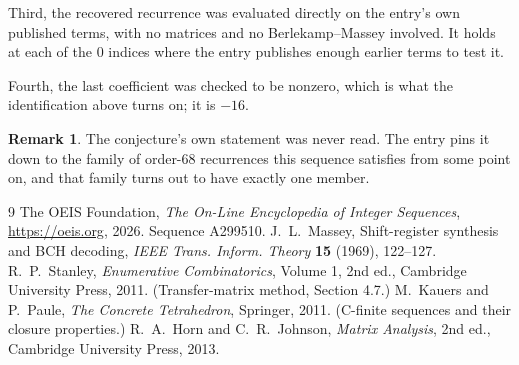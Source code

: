 \documentclass[11pt,a4paper]{article}
\theoremstyle{plain}
\theoremstyle{definition}
\newtheorem{remark}[theorem]{Remark}
\begin{document}
Third, the recovered recurrence was evaluated directly on the entry's own published terms, with
no matrices and no Berlekamp--Massey involved. It holds at each of the $0$ indices where
the entry publishes enough earlier terms to test it.

Fourth, the last coefficient was checked to be nonzero, which is what the identification above
turns on; it is $-16$.

\begin{remark}
The conjecture's own statement was never read. The entry pins it down to the family of
order-$68$ recurrences this sequence satisfies from some point on, and that family turns
out to have exactly one member.
\end{remark}

\begin{thebibliography}{9}
 The OEIS Foundation, \emph{The On-Line Encyclopedia of Integer
Sequences}, \url{https://oeis.org}, 2026. Sequence A299510.
 J.~L.~Massey, Shift-register synthesis and BCH decoding, \emph{IEEE
Trans. Inform. Theory} \textbf{15} (1969), 122--127.
 R.~P.~Stanley, \emph{Enumerative Combinatorics}, Volume 1, 2nd ed.,
Cambridge University Press, 2011. (Transfer-matrix method, Section 4.7.)
 M.~Kauers and P.~Paule, \emph{The Concrete Tetrahedron}, Springer, 2011.
(C-finite sequences and their closure properties.)
 R.~A.~Horn and C.~R.~Johnson, \emph{Matrix Analysis}, 2nd ed., Cambridge
University Press, 2013.
\end{thebibliography}
\end{document}
